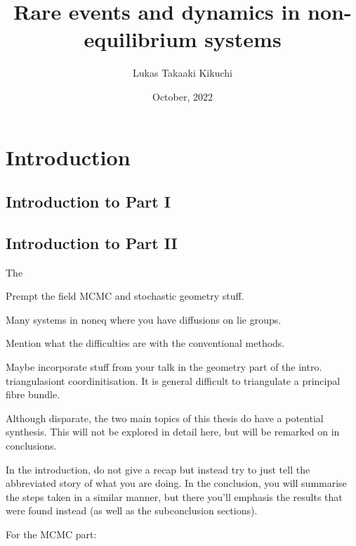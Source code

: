 \documentclass[withindex,glossary,techreport]{cam-thesis}
\title{Rare events and dynamics in non-equilibrium systems}
\author{Lukas Takaaki Kikuchi}
\date{October, 2022}
\begin{document}
\frontmatter{}









\chapter*{Introduction}

\section*{Introduction to Part I}

\section*{Introduction to Part II}

The 

Prempt the field MCMC and stochastic geometry stuff.

Many systems in noneq where you have diffusions on lie groups.

Mention what the difficulties are with the conventional methods.

Maybe incorporate stuff from your talk in the geometry part of the intro. triangulasiont coordinitisation. It is general difficult to triangulate a principal fibre bundle.

Although disparate, the two main topics of this thesis do have a potential synthesis. This will not be explored in detail here, but will be remarked on in conclusions.


{\color{red} In the introduction, do not give a recap but instead try to just tell the abbreviated story of what you are doing. In the conclusion, you will summarise the steps taken in a similar manner, but there you'll emphasis the results that were found instead (as well as the subconclusion sections)}.

For the MCMC part:
\end{document}
